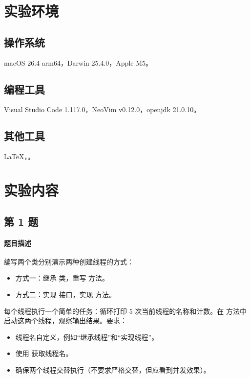 \documentclass{academics}
\begin{document}
\makeacademicscover

\section{实验环境}

\subsection{操作系统}

macOS 26.4 arm64，Darwin 25.4.0，Apple M5。

\subsection{编程工具}

Visual Studio Code 1.117.0，NeoVim v0.12.0，openjdk 21.0.10。

\subsection{其他工具}

\LaTeX{}，。

\section{实验内容}

\subsection{第 1 题}

\paragraph{题目描述} {
    编写两个类分别演示两种创建线程的方式：
    \begin{itemize}
        \item 方式一：继承  类，重写  方法。
        \item 方式二：实现  接口，实现  方法。
    \end{itemize}
    每个线程执行一个简单的任务：循环打印 $5$ 次当前线程的名称和计数。在  方法中启动这两个线程，观察输出结果。要求：
    \begin{itemize}
        \item 线程名自定义，例如``继承线程''和``实现线程''。
        \item 使用  获取线程名。
        \item 确保两个线程交替执行（不要求严格交替，但应看到并发效果）。
    \end{itemize}
}
\end{document}
